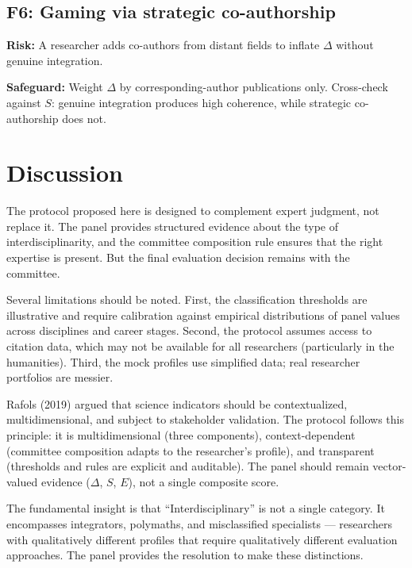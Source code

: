 \documentclass[
]{article}
\begin{document}
\hypertarget{f6-gaming-via-strategic-co-authorship}{%
\subsection{F6: Gaming via strategic
co-authorship}\label{f6-gaming-via-strategic-co-authorship}}

\textbf{Risk:} A researcher adds co-authors from distant fields to
inflate \(\Delta\) without genuine integration.

\textbf{Safeguard:} Weight \(\Delta\) by corresponding-author
publications only. Cross-check against \(S\): genuine integration
produces high coherence, while strategic co-authorship does not.

\hypertarget{discussion}{%
\section{Discussion}\label{discussion}}

The protocol proposed here is designed to complement expert judgment,
not replace it. The panel provides structured evidence about the type of
interdisciplinarity, and the committee composition rule ensures that the
right expertise is present. But the final evaluation decision remains
with the committee.

Several limitations should be noted. First, the classification
thresholds are illustrative and require calibration against empirical
distributions of panel values across disciplines and career stages.
Second, the protocol assumes access to citation data, which may not be
available for all researchers (particularly in the humanities). Third,
the mock profiles use simplified data; real researcher portfolios are
messier.

Rafols (2019) argued that science indicators should be contextualized,
multidimensional, and subject to stakeholder validation. The protocol
follows this principle: it is multidimensional (three components),
context-dependent (committee composition adapts to the researcher's
profile), and transparent (thresholds and rules are explicit and
auditable). The panel should remain vector-valued evidence (\(\Delta\),
\(S\), \(E\)), not a single composite score.

The fundamental insight is that ``Interdisciplinary'' is not a single
category. It encompasses integrators, polymaths, and misclassified
specialists --- researchers with qualitatively different profiles that
require qualitatively different evaluation approaches. The panel
provides the resolution to make these distinctions.
\end{document}
